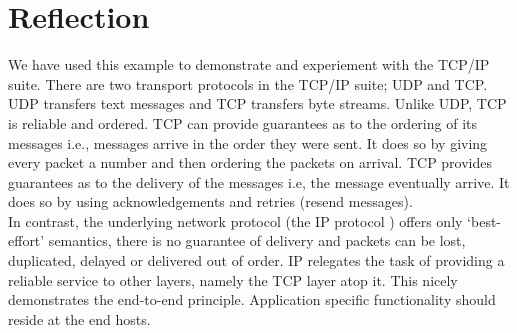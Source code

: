 \section{Reflection}
\label{tcp_reflection}

We have used this example to demonstrate and experiement with the TCP/IP suite. There are two transport protocols in the TCP/IP suite; UDP and TCP. UDP transfers text messages and TCP transfers byte streams. Unlike UDP, TCP is reliable and ordered. TCP can provide guarantees as to the ordering of its messages i.e., messages arrive in the order they were sent. It does so by giving every packet a number and then ordering the packets on arrival. TCP provides guarantees as to the delivery of the messages i.e, the message eventually arrive. It does so by using acknowledgements and retries (resend messages).   \\

In contrast, the underlying network protocol (the IP protocol ) offers only ‘best-effort’ semantics, there is no guarantee of delivery and packets can be lost, duplicated, delayed or delivered out of order. IP relegates the task of providing a reliable service to other layers, namely the TCP layer atop it. This nicely demonstrates the end-to-end principle. Application specific functionality should reside at the end hosts.

